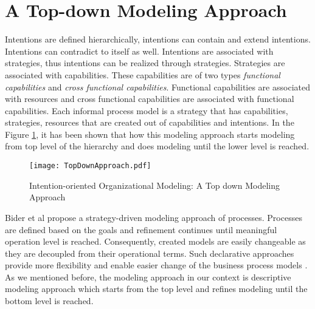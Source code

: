 \section{A Top-down Modeling Approach}
\label{sec:topdownapproach}
Intentions are defined hierarchically, intentions can contain and extend intentions. Intentions can contradict to itself as well. Intentions are associated with strategies, thus intentions can be realized through strategies. Strategies are associated with capabilities. These capabilities are of two types \textit{functional capabilities} and \textit{cross functional capabilities}. Functional capabilities are associated with resources and cross functional capabilities are associated with functional capabilities. Each informal process model is a strategy that has capabilities, strategies, resources that are created out of capabilities and intentions. In the Figure \ref{fig:topdownapproach}, it has been shown that how this modeling approach starts modeling from top level of the hierarchy and does modeling until the lower level is reached. 

\begin{figure}
	\centering
	\texttt{[image: TopDownApproach.pdf]}
	\caption{Intention-oriented Organizational Modeling: A Top down Modeling Approach}
	\label{fig:topdownapproach}
\end{figure}

Bider et al \cite{bider2005strategy} propose a strategy-driven modeling approach of processes. Processes are defined based on the goals and refinement continues until meaningful operation level is reached. Consequently, created models are easily changeable as they are decoupled from their operational terms. Such declarative approaches provide more flexibility and enable easier change of the business process models \cite{Sungur2016}. As we mentioned before, the modeling approach in our context is descriptive modeling approach which starts from the top level and refines modeling until the bottom level is reached. 

